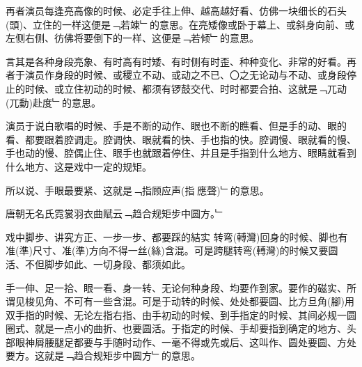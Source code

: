 \documentclass{zhvt-classic}
\begin{document}
再者演员每逢亮高像的时候、必定手往上伸、越高越好看、仿佛一块细长的石头(頭)、立住的一样这便是﹁若竦﹂的意思。在亮矮像或卧于幕上、或斜身向前、或左侧右侧、彷佛将要倒下的一样、这便是﹁若倾﹂的意思。

言其是各种身段亮象、有时高有时矮、有时侧有时歪、种种变化、非常的好看。再者于演员作身段的时候、或稷立不动、或动之不已、〇之无论动与不动、或身段停止的时候、或立住初动的时候、都须有锣鼓交代、时时都要合拍、这就是﹁兀动(兀動)赴度﹂的意思。

演员于说白歌唱的时候、手是不断的动作、眼也不断的瞧看、但是手的动、眼的看、都要跟着腔调走。腔调快、眼就看的快、手也指的快。腔调慢、眼就看的慢、手也动的慢、腔偶止住、眼手也就跟着停住、并且是手指到什么地方、眼睛就看到什么地方、这是戏中一定的规矩。

所以说、手眼最要紧、这就是﹁指顾应声(指𮸹應聲)﹂的意思。

\clearpage

\begin{preface}
  
唐朝无名氏霓裳羽衣曲赋云﹁趋合规矩步中圆方。﹂
\end{preface}

戏中脚步、讲究方正、一步一步、都要踩的結实 转弯(𨍭灣)回身的时候、脚也有准(準)尺寸、准(準)方向不得一丝(絲)含混。可是跨腿转弯(𨍭灣)的时候又要圆活、不但脚步如此、一切身段、都须如此。

手一伸、足一拾、眼一看、身一转、无论何种身段、均要作到家。要作的磁实、所谓见梭见角、不可有一些含混。可是于动转的时候、处处都要圆、比方旦角(腳)用双手指的时候、无论左指右指、由手初动的时候、到手指定的时候、其间必规一圆圈式、就是一点小的曲折、也要圆活。于指定的时候、手却要指到确定的地方、头部眼神屑腰腿足都要与手随时动作、一毫不得或先或后、这叫作、圆处要圆、方处要方。这就是﹁趋合规矩步中圆方﹂的意思。
\end{document}

